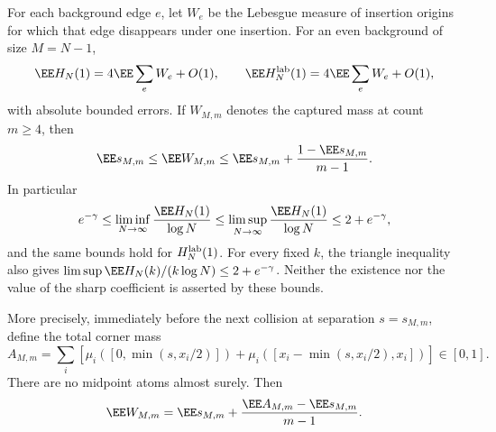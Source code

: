 \documentclass[11pt,letterpaper]{article}
\begin{document}
\begin{proposition}
\label{prop:history-capture}
For each background edge $e$, let $W_e$ be the Lebesgue measure of
insertion origins for which that edge disappears under one insertion.
For an even background of size $M=N-1$,
\begin{equation}\label{eq:history-capture-linearization}
 \EE H_N(1)=4\EE\sum_e W_e+O(1),\qquad
 \EE H_N^{\rm lab}(1)=4\EE\sum_e W_e+O(1),
\end{equation}
with absolute bounded errors. If $W_{M,m}$ denotes the captured mass
at count $m\ge4$, then
\begin{equation}\label{eq:capture-mean-bounds}
 \EE s_{M,m}\le\EE W_{M,m}
 \le\EE s_{M,m}+\frac{1-\EE s_{M,m}}{m-1}.
\end{equation}
In particular
\begin{equation}\label{eq:history-one-coefficient-bounds}
 e^{-\gamma}\le
 \liminf_{N\to\infty}\frac{\EE H_N(1)}{\log N}
 \le\limsup_{N\to\infty}\frac{\EE H_N(1)}{\log N}
 \le2+e^{-\gamma},
\end{equation}
and the same bounds hold for $H_N^{\rm lab}(1)$.
For every fixed $k$, the triangle inequality also gives
$\limsup\EE H_N(k)/(k\log N)\le2+e^{-\gamma}$.
Neither the existence nor the value of the sharp coefficient is
asserted by these bounds.

More precisely, immediately before the next collision at separation
$s=s_{M,m}$, define the total corner mass
\[
 A_{M,m}=\sum_i\left[
   \mu_i([0,\min(s,x_i/2)])+
   \mu_i([x_i-\min(s,x_i/2),x_i])\right]\in[0,1].
\]
There are no midpoint atoms almost surely. Then
\begin{equation}\label{eq:capture-corner-identity}
 \EE W_{M,m}
   =\EE s_{M,m}+\frac{\EE A_{M,m}-\EE s_{M,m}}{m-1}.
\end{equation}
\end{proposition}
\end{document}
